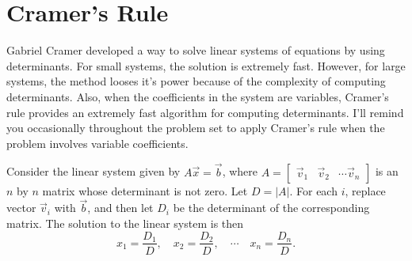 \section{Cramer's Rule}
Gabriel Cramer developed a way to solve linear systems of equations by using determinants. For small systems, the solution is extremely fast.  However, for large systems, the method looses it's power because of the complexity of computing determinants.  Also, when the coefficients in the system are variables, Cramer's rule provides an extremely fast algorithm for computing determinants. I'll remind you occasionally throughout the problem set to apply Cramer's rule when the problem involves variable coefficients.
\begin{theorem}\label{Cramer's Rule}
 Consider the linear system given by $A\vec x = \vec b$, where 
$A=\begin{bmatrix}\vec v_1 &\vec v_2 &\cdots \vec v_n \end{bmatrix}$
is an $n$ by $n$ matrix whose determinant is not zero.  Let $D=|A|$. For each $i$, replace vector $\vec v_i$ with $\vec b$, and then let $D_i$ be the determinant of the corresponding matrix. The solution to the linear system is then 
$$x_1 = \frac{D_1}{D},\quad x_2 = \frac{D_2}{D},\quad \cdots \quad x_n = \frac{D_n}{D}.$$


\end{theorem}
